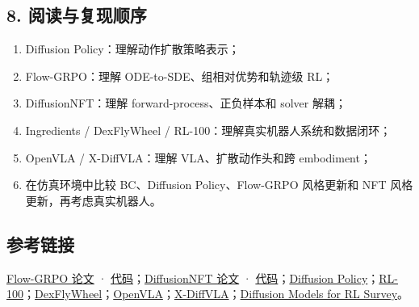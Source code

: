 \documentclass[
  chinese,
]{article}
\providecommand{\tightlist}{%
  \setlength{\itemsep}{0pt}\setlength{\parskip}{0pt}}
\begin{document}
\subsection{8.
阅读与复现顺序}\label{8-ux9605ux8bfbux4e0eux590dux73b0ux987aux5e8f}

\begin{enumerate}
\def\labelenumi{\arabic{enumi}.}
\tightlist
\item
  Diffusion Policy：理解动作扩散策略表示；
\item
  Flow-GRPO：理解 ODE-to-SDE、组相对优势和轨迹级 RL；
\item
  DiffusionNFT：理解 forward-process、正负样本和 solver 解耦；
\item
  Ingredients / DexFlyWheel / RL-100：理解真实机器人系统和数据闭环；
\item
  OpenVLA / X-DiffVLA：理解 VLA、扩散动作头和跨 embodiment；
\item
  在仿真环境中比较 BC、Diffusion Policy、Flow-GRPO 风格更新和 NFT
  风格更新，再考虑真实机器人。
\end{enumerate}

\subsection{参考链接}\label{ux53c2ux8003ux94feux63a5}

\href{https://arxiv.org/abs/2505.05470}{Flow-GRPO 论文} ·
\href{https://github.com/yifan123/flow_grpo}{代码}；\href{https://arxiv.org/abs/2509.16117}{DiffusionNFT
论文} ·
\href{https://github.com/NVlabs/DiffusionNFT}{代码}；\href{https://arxiv.org/abs/2303.04137}{Diffusion
Policy}；\href{https://arxiv.org/abs/2510.14830}{RL-100}；\href{https://arxiv.org/abs/2509.23829}{DexFlyWheel}；\href{https://arxiv.org/abs/2406.09246}{OpenVLA}；\href{https://arxiv.org/abs/2605.25044}{X-DiffVLA}；\href{https://arxiv.org/abs/2311.01223}{Diffusion
Models for RL Survey}。
\end{document}
